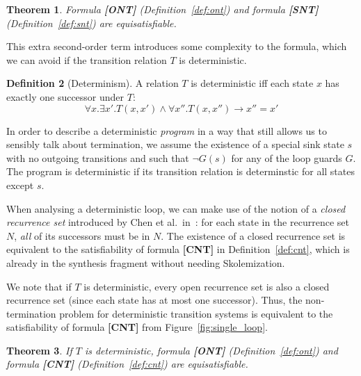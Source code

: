 \documentclass[preprint]{sigplanconf}
\newtheorem{theorem}{Theorem}
\theoremstyle{definition}
\newtheorem{definition}[theorem]{Definition}
\begin{document}
\begin{theorem}
 \label{thm:snt}
 Formula {\bf [ONT]} (Definition~\ref{def:ont}) and formula {\bf [SNT]} (Definition~\ref{def:snt}) are equisatisfiable.
\end{theorem}


This extra second-order term introduces some complexity to the formula, which
we can avoid if the transition relation $T$ is deterministic.
\begin{definition}[Determinism]
 A relation $T$ is deterministic iff each state $x$ has exactly one successor under $T$:
 $$\forall x . \exists x' . T(x, x') \wedge \forall x'' . T(x, x'') \rightarrow x'' = x'$$
\end{definition}
In order to describe a deterministic \emph{program} in a way that still allows us
to sensibly talk about termination, we assume the existence of a special sink
state $s$ with no outgoing transitions and such that $\lnot G(s)$ for any
of the loop guards $G$.  The program is deterministic if its transition
relation is determinstic for all states except $s$.

When analysing a deterministic loop, we can make use of the notion of a \emph{closed recurrence set}
introduced by Chen et al.~in~\cite{DBLP:conf/tacas/ChenCFNO14}:  for each
state in the recurrence set $N$, \emph{all} of its successors must be in $N$.
The existence of a closed recurrence set is equivalent to the satisfiability
of formula {\bf [CNT]} in Definition~\ref{def:cnt}, which is already in the synthesis
fragment without needing Skolemization.

We note that if $T$ is deterministic, every open recurrence set is also a
closed recurrence set (since each state has at most one successor).  Thus,
the non-termination problem for deterministic transition systems is
equivalent to the satisfiability of formula {\bf [CNT]} from Figure~\ref{fig:single_loop}.


\begin{theorem}
\label{thm:cnt}
 If $T$ is deterministic,
formula {\bf [ONT]} (Definition~\ref{def:ont}) and formula {\bf [CNT]} (Definition~\ref{def:cnt}) are equisatisfiable.
\end{theorem}

%  
\end{document}
